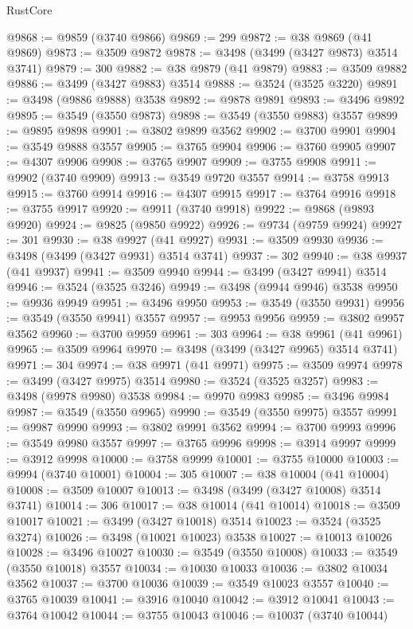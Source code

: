 \begin{lexlean}{RustCore}
\begin{coremodule}
@9868 := @9859 (@3740 @9866)
@9869 := 299
@9872 := @38 @9869 (@41 @9869)
@9873 := @3509 @9872
@9878 := @3498 (@3499 (@3427 @9873) @3514 @3741)
@9879 := 300
@9882 := @38 @9879 (@41 @9879)
@9883 := @3509 @9882
@9886 := @3499 (@3427 @9883) @3514
@9888 := @3524 (@3525 @3220)
@9891 := @3498 (@9886 @9888) @3538
@9892 := @9878 @9891
@9893 := @3496 @9892
@9895 := @3549 (@3550 @9873)
@9898 := @3549 (@3550 @9883) @3557
@9899 := @9895 @9898
@9901 := @3802 @9899 @3562
@9902 := @3700 @9901
@9904 := @3549 @9888 @3557
@9905 := @3765 @9904
@9906 := @3760 @9905
@9907 := @4307 @9906
@9908 := @3765 @9907
@9909 := @3755 @9908
@9911 := @9902 (@3740 @9909)
@9913 := @3549 @9720 @3557
@9914 := @3758 @9913
@9915 := @3760 @9914
@9916 := @4307 @9915
@9917 := @3764 @9916
@9918 := @3755 @9917
@9920 := @9911 (@3740 @9918)
@9922 := @9868 (@9893 @9920)
@9924 := @9825 (@9850 @9922)
@9926 := @9734 (@9759 @9924)
@9927 := 301
@9930 := @38 @9927 (@41 @9927)
@9931 := @3509 @9930
@9936 := @3498 (@3499 (@3427 @9931) @3514 @3741)
@9937 := 302
@9940 := @38 @9937 (@41 @9937)
@9941 := @3509 @9940
@9944 := @3499 (@3427 @9941) @3514
@9946 := @3524 (@3525 @3246)
@9949 := @3498 (@9944 @9946) @3538
@9950 := @9936 @9949
@9951 := @3496 @9950
@9953 := @3549 (@3550 @9931)
@9956 := @3549 (@3550 @9941) @3557
@9957 := @9953 @9956
@9959 := @3802 @9957 @3562
@9960 := @3700 @9959
@9961 := 303
@9964 := @38 @9961 (@41 @9961)
@9965 := @3509 @9964
@9970 := @3498 (@3499 (@3427 @9965) @3514 @3741)
@9971 := 304
@9974 := @38 @9971 (@41 @9971)
@9975 := @3509 @9974
@9978 := @3499 (@3427 @9975) @3514
@9980 := @3524 (@3525 @3257)
@9983 := @3498 (@9978 @9980) @3538
@9984 := @9970 @9983
@9985 := @3496 @9984
@9987 := @3549 (@3550 @9965)
@9990 := @3549 (@3550 @9975) @3557
@9991 := @9987 @9990
@9993 := @3802 @9991 @3562
@9994 := @3700 @9993
@9996 := @3549 @9980 @3557
@9997 := @3765 @9996
@9998 := @3914 @9997
@9999 := @3912 @9998
@10000 := @3758 @9999
@10001 := @3755 @10000
@10003 := @9994 (@3740 @10001)
@10004 := 305
@10007 := @38 @10004 (@41 @10004)
@10008 := @3509 @10007
@10013 := @3498 (@3499 (@3427 @10008) @3514 @3741)
@10014 := 306
@10017 := @38 @10014 (@41 @10014)
@10018 := @3509 @10017
@10021 := @3499 (@3427 @10018) @3514
@10023 := @3524 (@3525 @3274)
@10026 := @3498 (@10021 @10023) @3538
@10027 := @10013 @10026
@10028 := @3496 @10027
@10030 := @3549 (@3550 @10008)
@10033 := @3549 (@3550 @10018) @3557
@10034 := @10030 @10033
@10036 := @3802 @10034 @3562
@10037 := @3700 @10036
@10039 := @3549 @10023 @3557
@10040 := @3765 @10039
@10041 := @3916 @10040
@10042 := @3912 @10041
@10043 := @3764 @10042
@10044 := @3755 @10043
@10046 := @10037 (@3740 @10044)

\end{coremodule}
\end{lexlean}
